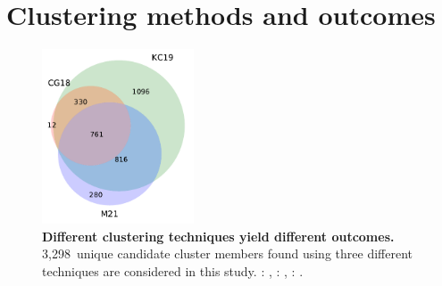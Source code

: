 \documentclass[12pt,twocolumn,tighten]{aastex63}
\newcommand{\nkinematic}{3{,}298\ } %
\begin{document}

% 
% 
% 
% 
% 
% 

\clearpage
                            
 

\appendix
\section{Clustering methods and outcomes}
\label{app:clustering}

\begin{figure}[h]
	\begin{center}
		\leavevmode
		\includegraphics[width=0.4\textwidth]{f10.pdf}
	\end{center}
	\vspace{-0.7cm}
  \caption{ {\bf Different clustering techniques yield different
  outcomes.} \nkinematic unique candidate cluster members found
  using three different techniques are considered in this study.
  : \citet{cantatgaudin_gaia_2018},
  :
  \citet{kounkel_untangling_2019}, :
  \citet{meingast_2021}.
  \label{fig:venn}
	}
\end{figure}
\end{document}

